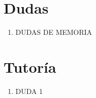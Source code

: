 \chapter*{Dudas}
\begin{enumerate}
    \item DUDAS DE MEMORIA
\end{enumerate}
\chapter*{Tutoría}
\begin{enumerate}
    \item DUDA 1
\end{enumerate}
